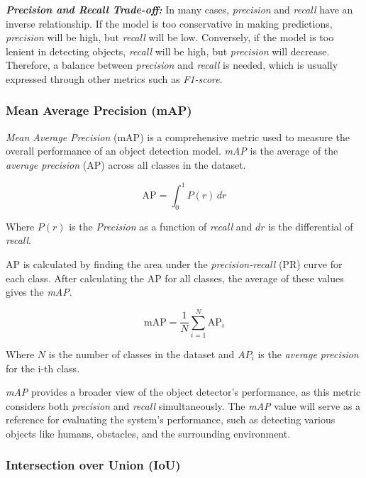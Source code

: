 \textbf{\emph{Precision and Recall Trade-off:}} In many cases, \emph{precision} and \emph{recall} have an inverse relationship. If the model is too conservative in making predictions, \emph{precision} will be high, but \emph{recall} will be low. Conversely, if the model is too lenient in detecting objects, \emph{recall} will be high, but \emph{precision} will decrease. Therefore, a balance between \emph{precision} and \emph{recall} is needed, which is usually expressed through other metrics such as \emph{F1-score}.

\subsubsection{Mean Average Precision (mAP)}
\label{subsubsec:mAP}

\emph{Mean Average Precision} (mAP) is a comprehensive metric used to measure the overall performance of an object detection model. \emph{mAP} is the average of the \emph{average precision} (AP) across all classes in the dataset.

\begin{equation}
  \mathrm{AP} = \int_0^1 P(r) \, dr
\end{equation}

Where \(P(r)\) is the \emph{Precision} as a function of \emph{recall} and \(dr\) is the differential of \emph{recall}.

AP is calculated by finding the area under the \emph{precision-recall} (PR) curve for each class. After calculating the AP for all classes, the average of these values gives the \emph{mAP}.

\begin{equation}
  \mathrm{mAP} = \frac{1}{N} \sum_{i=1}^{N} \mathrm{AP}_i
\end{equation}

Where \(N\) is the number of classes in the dataset and \(AP_i\) is the \emph{average precision} for the i-th class.

\emph{mAP} provides a broader view of the object detector's performance, as this metric considers both \emph{precision} and \emph{recall} simultaneously. The \emph{mAP} value will serve as a reference for evaluating the system's performance, such as detecting various objects like humans, obstacles, and the surrounding environment.

\subsubsection{Intersection over Union (IoU)}
\label{subsubsec:IoU}


